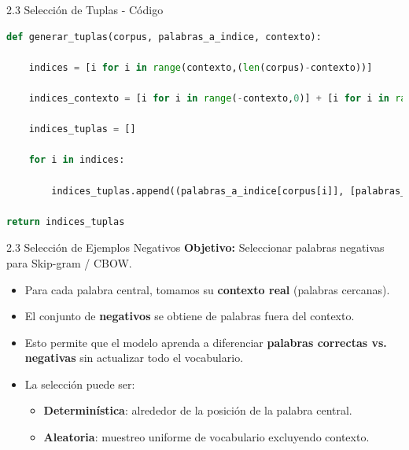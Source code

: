 \documentclass{beamer}
\begin{document}
\begin{frame}[fragile]{2.3 Selección de Tuplas - Código}
	\begin{block}{}
		\begin{lstlisting}[language=Python]
def generar_tuplas(corpus, palabras_a_indice, contexto):

	indices = [i for i in range(contexto,(len(corpus)-contexto))]
	
	indices_contexto = [i for i in range(-contexto,0)] + [i for i in range(1,contexto+1)]
	
	indices_tuplas = []
	
	for i in indices:
	
		indices_tuplas.append((palabras_a_indice[corpus[i]], [palabras_a_indice[corpus[i+j]] for j in indices_contexto]))

return indices_tuplas  
		\end{lstlisting}
	\end{block}
\end{frame}





\begin{frame}{2.3 Selección de Ejemplos Negativos}
	\justifying
	\textbf{Objetivo:} Seleccionar palabras negativas para Skip-gram / CBOW.  
	
	\begin{itemize}
		\item Para cada palabra central, tomamos su \textbf{contexto real} (palabras cercanas).  
		\item El conjunto de \textbf{negativos} se obtiene de palabras fuera del contexto.  
		\item Esto permite que el modelo aprenda a diferenciar \textbf{palabras correctas vs. negativas} sin actualizar todo el vocabulario.  
		\item La selección puede ser:  
		\begin{itemize}
			\item \textbf{Determinística}: alrededor de la posición de la palabra central.  
			\item \textbf{Aleatoria}: muestreo uniforme de vocabulario excluyendo contexto.
		\end{itemize}
	\end{itemize}
\end{frame}
\end{document}
